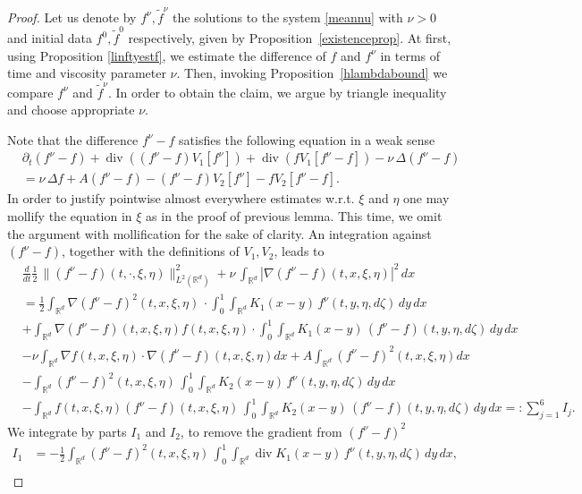 \documentclass[10pt]{article}
\def\divv{\operatorname {div}}
\newcommand{\R}{\mathbb{R}}
\newcommand{\ird}{\int_{\mathbb{R}^d}}
\begin{document}
\begin{proof}
Let us  denote by $f^\nu,\tilde{f}^\nu$ the solutions  to the system \eqref{meannu} with $
\nu  > 0$ and initial data $f^0, \tilde{f}^0$ respectively,  given by Proposition~\ref{existenceprop}.
At first, using Proposition \ref{linftyestf}, we estimate the difference of $f$ and $f^\nu$ in terms of time and viscosity parameter $\nu$.  Then, invoking Proposition~\ref{hlambdabound} we compare $f^\nu$ and $\tilde f^\nu$. In order to obtain the claim, we argue by triangle inequality and choose appropriate $\nu$.

Note that the difference $f^\nu-f$ satisfies the following equation in a weak sense
\begin{align*}
 & \partial_t ( f^\nu- f)+\divv\left( ( f^\nu- f)V_1[f^\nu]\right)
     +\divv(  f V_1[f^{\nu}-f]) -\nu\,\Delta ( f^\nu- f)  \\
 & =\nu\,\Delta  f  + A( f^\nu- f) - ( f^\nu- f)V_2[f^\nu]
   - fV_2[f^\nu-f].    
\end{align*}
In order to justify pointwise almost everywhere estimates w.r.t. $\xi$ and $\eta$ one may mollify the equation in $\xi$ as in the proof of previous lemma. This time, we omit the argument with mollification for the sake of clarity. An integration against $(f^{\nu}-f)$, together with the definitions of $V_1,V_2$, leads to 
\begin{align*}
    &  \frac{d}{dt} \frac{1}{2}\,\| (f^\nu-f)(t, \cdot, \xi,\eta)\|_{L^2(\R^d)}^2 +{\nu}\,\int_{\R^d} |\nabla  (f^\nu-f) (t, x, \xi,\eta)|^2\,dx \\
 &   =\frac{1}{2}\ird\nabla(f^\nu-f)^2(t,x,\xi,\eta)\,\cdot\int_0^1\int_{\R^{d}}  K_1(x-y)\, f^\nu(t,y,\eta, d\zeta) \,dy \,dx\\
&+ \ird\nabla(f^\nu-f)(t,x,\xi,\eta) f(t,x,\xi,\eta)\cdot \int_0^1\int_{\R^{d}}  K_1(x-y)\, (f^\nu-f)(t,y, \eta,d\zeta) \,dy \,dx\\
&  - \nu \ird \nabla f(t,x,\xi,\eta)\cdot\nabla(f^\nu - f)(t,x,\xi,\eta)dx + A \ird (f^\nu - f)^2(t,x,\xi,\eta)dx  \\
&-\ird (f^\nu-f)^2(t,x,\xi,\eta)\,\int_0^1\int_{\R^{d}}  K_2(x-y)\, f^\nu(t,y,\eta, d\zeta) \,dy \,dx\\
&-\ird f(t,x,\xi,\eta)(f^\nu - f)(t,x,\xi,\eta)\,\int_0^1\int_{\R^{d}}  K_2(x-y)\, (f^\nu-f)(t,y,\eta, d\zeta) \,dy \,dx =: \sum_{j=1}^6 I_j.
\end{align*}
We integrate by parts $I_1$ and $I_2$, to remove the gradient from $(f^\nu -f)^2$
\begin{align*}
    I_1 &= -\frac{1}{2}\ird(f^\nu-f)^2(t,x,\xi,\eta)\,\int_0^1\int_{\R^{d}} \divv K_1(x-y)\, f^\nu(t,y,\eta, d\zeta) \,dy \,dx,\\

\end{align*}
\end{proof}
\end{document}

